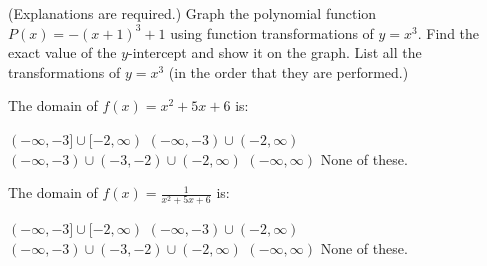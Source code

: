 \documentclass[11pt,answers]{exam}
\begin{document}
\begin{questions}
\begin{tikzpicture}
\end{tikzpicture}


\newpage

\question[3] (Explanations are required.) Graph the polynomial function $\displaystyle P(x)=-(x+1)^3+1$ using function transformations of $\displaystyle y=x^3$. Find the exact value of the $y$-intercept and show it on the graph. List all the transformations of $y=x^3$ (in the order that they are performed.)

\fillwithdottedlines{4cm}


\bonusquestion[1] The domain of $\displaystyle f(x)=x^2+5x+6$ is: 
\begin{oneparchoices}
\choice $(-\infty,-3]\cup [-2,\infty)$
\choice $(-\infty,-3)\cup (-2,\infty)$
\choice $(-\infty,-3)\cup (-3,-2)\cup  (-2,\infty)$
\choice $(-\infty,\infty)$
\choice None of these.
\end{oneparchoices}

\question[1] The domain of $\displaystyle f(x)=\frac{1}{x^2+5x+6}$ is:
 \begin{oneparchoices}
\choice $(-\infty,-3]\cup [-2,\infty)$
\choice $(-\infty,-3)\cup (-2,\infty)$
\choice $(-\infty,-3)\cup (-3,-2)\cup  (-2,\infty)$
\choice $(-\infty,\infty)$
\choice None of these.
\end{oneparchoices}


\end{questions}
\end{document}
